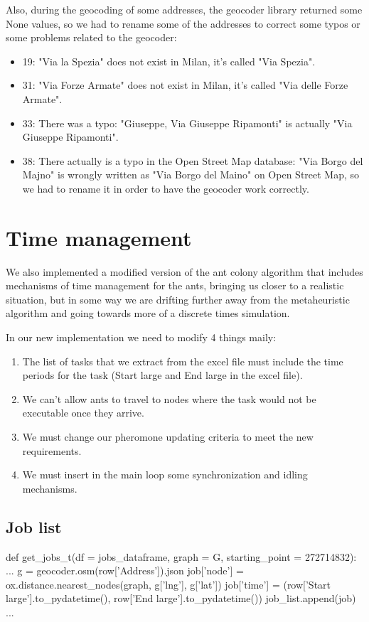 \documentclass[titlepage]{article}
\begin{document}
Also, during the geocoding of some addresses, the geocoder library returned some None values, so we had to rename some of the addresses to correct some typos or some problems related to the geocoder:
\begin{itemize}
    \item 19: "Via la Spezia" does not exist in Milan, it's called "Via Spezia".
    \item 31: "Via Forze Armate" does not exist in Milan, it's called "Via delle Forze Armate".
    \item 33: There was a typo: "Giuseppe, Via Giuseppe Ripamonti" is actually "Via Giuseppe Ripamonti".
    \item 38: There actually is a typo in the Open Street Map database: "Via Borgo del Majno" is wrongly written as "Via Borgo del Maino" on Open Street Map, so we had to rename it in order to have the geocoder work correctly.
\end{itemize}

\section{Time management}
We also implemented a modified version of the ant colony algorithm that includes mechanisms of time management for the ants, bringing us closer to a realistic situation, but in some way we are drifting further away from the metaheuristic algorithm and going towards more of a discrete times simulation.

In our new implementation we need to modify 4 things maily:
\begin{enumerate}
    \item The list of tasks that we extract from the excel file must include the time periods for the task (Start large and End large in the excel file).
    \item We can't allow ants to travel to nodes where the task would not be executable once they arrive.
    \item We must change our pheromone updating criteria to meet the new requirements.
    \item We must insert in the main loop some synchronization and idling mechanisms.
\end{enumerate}

\subsection{Job list}
\begin{python}
def get_jobs_t(df = jobs_dataframe, graph = G, starting_point = 272714832):
    ...
        g = geocoder.osm(row['Address']).json
        job['node'] = ox.distance.nearest_nodes(graph, g['lng'], g['lat'])
        job['time'] = (row['Start large'].to_pydatetime(), row['End large'].to_pydatetime())
        job_list.append(job)
    ...
\end{python}
\end{document}
